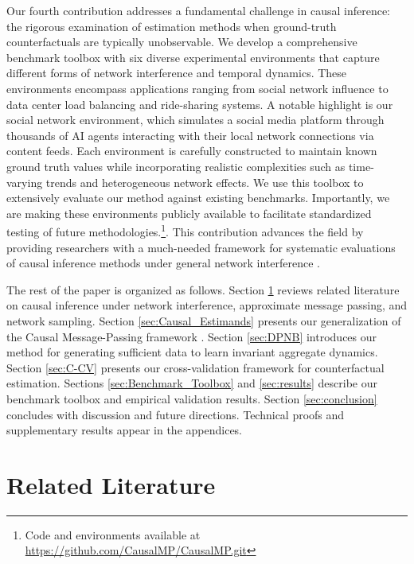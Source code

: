 Our fourth contribution addresses a fundamental challenge in causal inference: the rigorous examination of estimation methods when ground-truth counterfactuals are typically unobservable. We develop a comprehensive benchmark toolbox with six diverse experimental environments that capture different forms of network interference and temporal dynamics. These environments encompass applications ranging from social network influence to data center load balancing and ride-sharing systems. A notable highlight is our social network environment, which simulates a social media platform through thousands of AI agents interacting with their local network connections via content feeds. Each environment is carefully constructed to maintain known ground truth values while incorporating realistic complexities such as time-varying trends and heterogeneous network effects. We use this toolbox to extensively evaluate our method against existing benchmarks. Importantly, we are making these environments publicly available to facilitate standardized testing of future methodologies.\footnote{Code and environments available at \url{https://github.com/CausalMP/CausalMP.git}}. This contribution advances the field by providing researchers with a much-needed framework for systematic evaluations of causal inference methods under general network interference \citep{basse2018limitations,savje2021average,arkhangelsky2023causal,imbens2024causal}.

The rest of the paper is organized as follows. Section \ref{sec:other-lit} reviews related literature on causal inference under network interference, approximate message passing, and network sampling. Section \ref{sec:Causal_Estimands} presents our generalization of the Causal Message-Passing framework \citep{shirani2024causal}. Section \ref{sec:DPNB} introduces our \batching{} method for generating sufficient data to learn invariant aggregate dynamics. Section \ref{sec:C-CV} presents our cross-validation framework for counterfactual estimation. Sections \ref{sec:Benchmark_Toolbox} and \ref{sec:results} describe our benchmark toolbox and empirical validation results. Section \ref{sec:conclusion} concludes with discussion and future directions. Technical proofs and supplementary results appear in the appendices.


\section{Related Literature}
\label{sec:other-lit}

